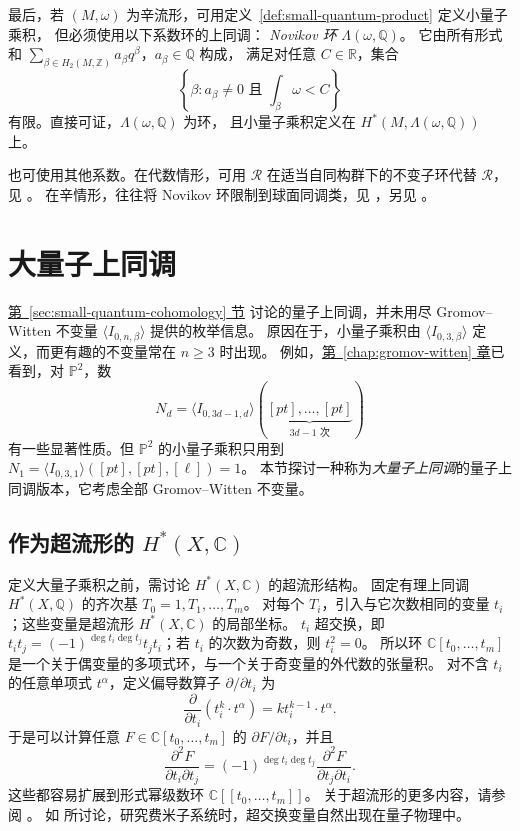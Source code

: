 最后，若 $(M,\omega)$ 为辛流形，可用定义~\ref{def:small-quantum-product} 定义小量子乘积，
但必须使用以下系数环的上同调：
\emph{Novikov 环} $\Lambda(\omega,\mathbb Q)$。
它由所有形式和 $\sum_{\beta\in H_2(M,\mathbb Z)}a_\beta q^\beta$，$a_\beta\in\mathbb Q$ 构成，
满足对任意 $C\in\mathbb R$，集合
\[
\left\{\beta:a_\beta\ne0\text{ 且 }\int_\beta\omega<C\right\}
\]
有限。直接可证，$\Lambda(\omega,\mathbb Q)$ 为环，
且小量子乘积定义在 $H^*(M,\Lambda(\omega,\mathbb Q))$ 上。

也可使用其他系数。在代数情形，可用 $\mathcal R$ 在适当自同构群下的不变子环代替 $\mathcal R$，见 。
在辛情形，往往将 Novikov 环限制到球面同调类，见 ，另见 。

\section{大量子上同调}\label{sec:big-quantum-cohomology}
\hyperref[sec:small-quantum-cohomology]{第~\ref*{sec:small-quantum-cohomology} 节}
讨论的量子上同调，并未用尽 Gromov--Witten 不变量 $\langle I_{0,n,\beta}\rangle$ 提供的枚举信息。
原因在于，小量子乘积由 $\langle I_{0,3,\beta}\rangle$ 定义，而更有趣的不变量常在 $n\geq3$ 时出现。
例如，\hyperref[chap:gromov-witten]{第~\ref*{chap:gromov-witten} 章}已看到，对 $\mathbb P^2$，数
\[
N_d=\langle I_{0,3d-1,d}\rangle(\underbrace{[pt],\ldots,[pt]}_{3d-1\text{ 次}})
\]
有一些显著性质。但 $\mathbb P^2$ 的小量子乘积只用到
$N_1=\langle I_{0,3,1}\rangle([pt],[pt],[\ell])=1$。
本节探讨一种称为\emph{大量子上同调}的量子上同调版本，它考虑全部 Gromov--Witten 不变量。

\subsection{作为超流形的 $H^*(X,\mathbb C)$}\label{subsec:cohomology-supermanifold}
定义大量子乘积之前，需讨论 $H^*(X,\mathbb C)$ 的超流形结构。
固定有理上同调 $H^*(X,\mathbb Q)$ 的齐次基 $T_0=1,T_1,\ldots,T_m$。
对每个 $T_i$，引入与它次数相同的变量 $t_i$；这些变量是超流形 $H^*(X,\mathbb C)$ 的局部坐标。
$t_i$ 超交换，即 $t_it_j=(-1)^{\deg t_i\deg t_j}t_jt_i$；若 $t_i$ 的次数为奇数，则 $t_i^2=0$。
所以环 $\mathbb C[t_0,\ldots,t_m]$ 是一个关于偶变量的多项式环，与一个关于奇变量的外代数的张量积。
对不含 $t_i$ 的任意单项式 $t^\alpha$，定义偏导数算子 $\partial/\partial t_i$ 为
\[
\frac\partial{\partial t_i}(t_i^k\cdot t^\alpha)=kt_i^{k-1}\cdot t^\alpha.
\]
于是可以计算任意 $F\in\mathbb C[t_0,\ldots,t_m]$ 的 $\partial F/\partial t_i$，并且
\[
\frac{\partial^2F}{\partial t_i\partial t_j}
=(-1)^{\deg t_i\deg t_j}\frac{\partial^2F}{\partial t_j\partial t_i}.
\]
这些都容易扩展到形式幂级数环 $\mathbb C[[t_0,\ldots,t_m]]$。
关于超流形的更多内容，请参阅 。
如  所讨论，研究费米子系统时，超交换变量自然出现在量子物理中。

